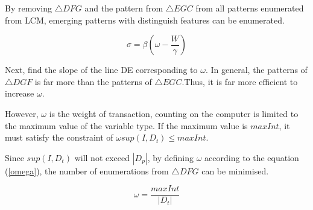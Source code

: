 By removing $\triangle{DFG}$ and the pattern from $\triangle{EGC}$ from all patterns enumerated from LCM, emerging patterns with distinguish features can be enumerated. 

\begin{equation}
\sigma=\beta (\omega-\frac{W}{\gamma})  \label{sigma_beta}
\end{equation}

Next, find the slope of the line DE corresponding to $\omega$.
In general, the patterns of $\triangle{DGF}$ is far more than the patterns of $\triangle{EGC}$.Thus, it is far more efficient to increase $\omega$.

However, $\omega$ is the weight of transaction, counting on the computer is limited to the maximum value of the variable type.
If the maximum value is $maxInt$, it must satisfy the constraint of $\omega sup(I,D_t)\le maxInt$.

Since $sup(I,D_t)$ will not exceed $|D_p|$, by defining $\omega$ according to the equation (\ref{omega}), the number of enumerations from $\triangle{DFG}$ can be minimised.

\begin{equation}
\omega=\frac{maxInt}{|D_t|} \label{omega}
\end{equation}


